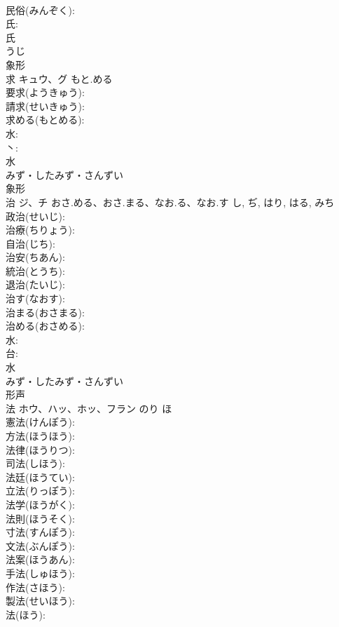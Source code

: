 \documentclass[8pt]{extreport}
\begin{document}
\begin{CJK}{UTF8}{min}
\\	民俗(みんぞく): 
\\	氏: 
\\	氏	
\\	うじ	
\\	象形 
\\	求	キュウ、グ	もと.める		
\\	要求(ようきゅう): 
\\	請求(せいきゅう): 
\\	求める(もとめる): 
\\	水: 
\\	丶: 
\\	水	
\\	みず・したみず・さんずい	
\\	象形 
\\	治	ジ、チ	おさ.める、おさ.まる、なお.る、なお.す	し, ぢ, はり, はる, みち	
\\	政治(せいじ): 
\\	治療(ちりょう): 
\\	自治(じち): 
\\	治安(ちあん): 
\\	統治(とうち): 
\\	退治(たいじ): 
\\	治す(なおす): 
\\	治まる(おさまる): 
\\	治める(おさめる): 
\\	水: 
\\	台: 
\\	水	
\\	みず・したみず・さんずい	
\\	形声 
\\	法	ホウ、ハッ、ホッ、フラン	のり	ほ	
\\	憲法(けんぽう): 
\\	方法(ほうほう): 
\\	法律(ほうりつ): 
\\	司法(しほう): 
\\	法廷(ほうてい): 
\\	立法(りっぽう): 
\\	法学(ほうがく): 
\\	法則(ほうそく): 
\\	寸法(すんぽう): 
\\	文法(ぶんぽう): 
\\	法案(ほうあん): 
\\	手法(しゅほう): 
\\	作法(さほう): 
\\	製法(せいほう): 
\\	法(ほう): 

\end{CJK}
\end{document}
